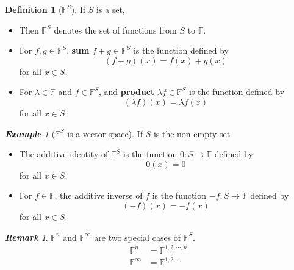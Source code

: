 \documentclass[paper=a4, fontsize=11pt]{scrartcl}
\numberwithin{equation}{section}		%
\numberwithin{figure}{section}			%
\numberwithin{table}{section}				%
\renewcommand{\to}{\ensuremath{\rightarrow}}
\theoremstyle{definition}
\newtheorem{definition}{Definition}[section]
\theoremstyle{remark}
\newtheorem*{remark}{\textbf{Remark}}
\theoremstyle{example}
\newtheorem{example}{\textbf{Example}}[section]
\begin{document}
\begin{definition}[$\mathbb{F}^{S}$]
    If $S$ is a set,
    \begin{itemize}
        \item Then $\mathbb{F}^{S}$ denotes the set of functions from $S$ to $\mathbb{F}$.
        \item For $f,g \in \mathbb{F}^{S}$, \textbf{sum} $f+g\in \mathbb{F}^{S}$ is the function defined by
        \begin{equation}
            (f+g)(x) = f(x) + g(x)
        \end{equation}
        for all $x \in S$.
        \item For $\lambda \in \mathbb{F}$ and $f \in \mathbb{F}^{S}$, and \textbf{product} $\lambda f \in \mathbb{F}^{S}$ is the function defined by
        \begin{equation}
            (\lambda f)(x) = \lambda f(x)
        \end{equation}
        for all $x \in S$.
    \end{itemize}
\end{definition}

\begin{example}[$\mathbb{F}^{S}$ is a vector space]
    If $S$ is the non-empty set
    \begin{itemize}
        \item The additive identity of $\mathbb{F}^{S}$ is the function $0: S \to \mathbb{F}$ defined by
        \begin{equation}
            0(x) = 0
        \end{equation}
        for all $x \in S$.
        \item For $f \in \mathbb{F}$, the additive inverse of $f$ is the function $-f: S \to \mathbb{F}$ defined by
        \begin{equation}
            (-f)(x) = -f(x)
        \end{equation}
        for all $x \in S$.
    \end{itemize}
\end{example}

\begin{remark}
    $\mathbb{F}^{n}$ and $\mathbb{F}^{\infty}$ are two special cases of $\mathbb{F}^{S}$.
    \begin{equation}
        \begin{aligned}
            \mathbb{F}^{n} &= \mathbb{F}^{1,2,\cdots,n}\\
            \mathbb{F}^{\infty} &= \mathbb{F}^{1,2,\cdots}
        \end{aligned}
    \end{equation}
\end{remark}
\end{document}
